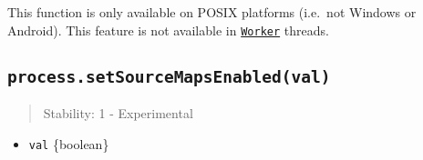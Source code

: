\begin{Shaded}
\begin{Highlighting}[]
  \OperatorTok{=} \NormalTok{(}\NormalTok{)}\OperatorTok{;}

\NormalTok{ (} \OperatorTok{\&\&} \NormalTok{) \{}
  \NormalTok{(}\SpecialCharTok{$\{}\NormalTok{()}\SpecialCharTok{\}}\VerbatimStringTok{\textasciigrave{}}\NormalTok{)}\OperatorTok{;}
  \NormalTok{ \{}
    \NormalTok{(}\NormalTok{)}\OperatorTok{;}
    \NormalTok{(}\SpecialCharTok{$\{}\NormalTok{()}\SpecialCharTok{\}}\VerbatimStringTok{\textasciigrave{}}\NormalTok{)}\OperatorTok{;}
\NormalTok{  \} }
    \NormalTok{(}\SpecialCharTok{$\{}\SpecialCharTok{\}}\VerbatimStringTok{\textasciigrave{}}\NormalTok{)}\OperatorTok{;}
\NormalTok{  \}}
\NormalTok{\}}
\end{Highlighting}
\end{Shaded}

This function is only available on POSIX platforms (i.e.~not Windows or
Android). This feature is not available in
\href{worker_threads.md\#class-worker}{\texttt{Worker}} threads.

\subsection{\texorpdfstring{\texttt{process.setSourceMapsEnabled(val)}}{process.setSourceMapsEnabled(val)}}\label{process.setsourcemapsenabledval}

\begin{quote}
Stability: 1 - Experimental
\end{quote}

\begin{itemize}
\tightlist
\item
  \texttt{val} \{boolean\}
\end{itemize}

